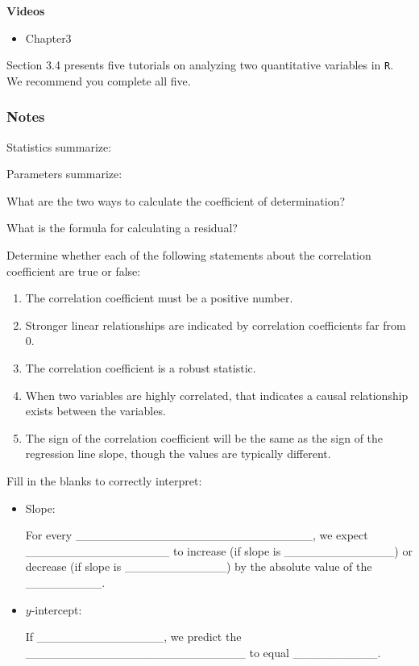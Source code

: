 \documentclass[
]{report}
\providecommand{\tightlist}{%
  \setlength{\itemsep}{0pt}\setlength{\parskip}{0pt}}
\newcommand{\rgs}{\vspace{12pt}} %
\begin{document}

\textbf{Videos}

\begin{itemize}
\tightlist
\item
  Chapter3
\end{itemize}


Section 3.4 presents five tutorials on analyzing two quantitative variables in \texttt{R}. We recommend you complete all five.

\hypertarget{notes-11}{%
\subsubsection*{Notes}\label{notes-11}}

Statistics summarize:
\rgs

Parameters summarize:
\rgs

What are the two ways to calculate the coefficient of determination?
\rgs

What is the formula for calculating a residual?
\rgs

Determine whether each of the following statements about the correlation coefficient are true or false:

\begin{enumerate}
\def\labelenumi{\arabic{enumi}.}
\item
  The correlation coefficient must be a positive number.
\item
  Stronger linear relationships are indicated by correlation coefficients far from 0.
\item
  The correlation coefficient is a robust statistic.
\item
  When two variables are highly correlated, that indicates a causal relationship exists between the variables.
\item
  The sign of the correlation coefficient will be the same as the sign of the regression line slope, though the values are typically different.
\end{enumerate}

Fill in the blanks to correctly interpret:

\begin{itemize}
\item
  Slope:

  For every \_\_\_\_\_\_\_\_\_\_\_\_\_\_\_\_\_\_\_\_\_\_\_\_\_\_\_\_, we expect \_\_\_\_\_\_\_\_\_\_\_\_\_\_\_\_\_ to increase (if slope is \_\_\_\_\_\_\_\_\_\_\_\_\_) or decrease (if slope is \_\_\_\_\_\_\_\_\_\_\_\_) by the absolute value of the \_\_\_\_\_\_\_\_\_.
\item
  \(y\)-intercept:

  If \_\_\_\_\_\_\_\_\_\_\_\_\_\_\_, we predict the \_\_\_\_\_\_\_\_\_\_\_\_\_\_\_\_\_\_\_\_\_\_\_\_\_\_ to equal \_\_\_\_\_\_\_\_\_\_.
\end{itemize}
\end{document}
